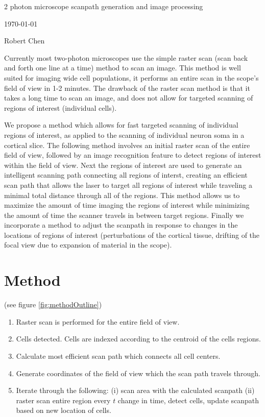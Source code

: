 \documentclass{article}
\begin{document}
\centerline{\sc \large 2 photon microscope scanpath generation and image processing}
\vspace{.5pc}
\today
\centerline{\sc Robert Chen}
\vspace{2pc}

Currently most two-photon microscopes use the simple raster scan (scan back
and forth one line at a time) method to scan an image.  This method is well 
suited for imaging wide cell populations, it performs an entire scan in the 
scope's field of view in 1-2 minutes. The drawback of the raster scan method 
is that it takes a long time to scan an image, and does not allow for targeted
scanning of regions of interest (individual cells).   

We propose a method which allows for fast targeted scanning of individual regions of interest, as applied to the scanning
of individual neuron soma in a cortical slice.  The following method involves an initial raster scan of the entire field of
view, followed by an image recognition feature to detect regions of interest within the field of view. Next the regions of
interest are used to generate an intelligent scanning path connecting all regions of interst, creating an efficient scan 
path that allows the laser to target all regions of interest while traveling a minimal total distance through all of the 
regions.  This method allows us to maximize the amount of time imaging the regions of interest while minimizing the amount of 
time the scanner travels in between target regions.  Finally we incorporate a method to adjust the scanpath in response
to changes in the locations of regions of interest (perturbations of the cortical tissue, drifting of the focal view due to 
expansion of material in the scope).

\section{Method}

(see figure \ref{fig:methodOutline}) 
\begin{enumerate}
  \item Raster scan is performed for the entire field of view.\vspace{-2mm}%
  \item Cells detected.  Cells are indexed according to the centroid of the cells regions.\vspace{-2mm}%
  \item Calculate most efficient scan path which connects all cell centers.\vspace{-2mm}%
  \item Generate coordinates of the field of view which the scan path travels through.\vspace{-2mm}%
  \item Iterate through the following: (i) scan area with the calculated scanpath (ii) raster scan entire region every $t$ 
        change in time, detect cells, update scanpath based on new location of cells.%
\end{enumerate}
\end{document}
